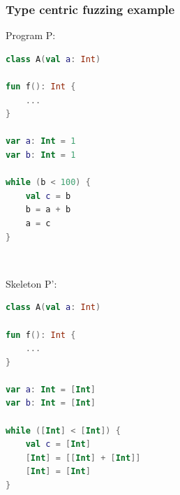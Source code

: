 
\begin{frame}[fragile]
	\frametitle{Type centric fuzzing example}
\begin{minipage}{0.4\linewidth}
Program P:
		\begin{lstlisting}[language=Kotlin,basicstyle=\footnotesize]
class A(val a: Int)

fun f(): Int {
    ...
}

var a: Int = 1
var b: Int = 1

while (b < 100) {
    val c = b
    b = a + b
    a = c
}
 \end{lstlisting}
	\end{minipage}
	\begin{minipage}{0.1\linewidth}
	\ \ 
	\end{minipage}
	\begin{minipage}{0.4\linewidth}
Skeleton P':
		\begin{lstlisting}[language=Kotlin,basicstyle=\footnotesize]
class A(val a: Int)

fun f(): Int {
    ...
}

var a: Int = [Int]
var b: Int = [Int]

while ([Int] < [Int]) {
    val c = [Int]
    [Int] = [[Int] + [Int]]
    [Int] = [Int]
}
	\end{lstlisting}
\end{minipage}
	
\end{frame}



